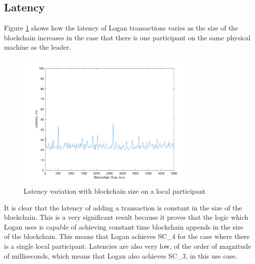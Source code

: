 \documentclass[12pt,a4paper,twoside,openright]{report}
\begin{document}
	\subsection{Latency}
	Figure \ref{fig:locallatency} shows how the latency of Logan transactions varies as the size of the blockchain increases in the case that there is one participant on the same physical machine as the leader. 
	\begin{figure}
		\centering
		\includegraphics[width=0.8\textwidth]{figs/local_latency_vs_size.png}
		\caption{Latency variation with blockchain size on a local participant}
		\label{fig:locallatency}
	\end{figure}
	It is clear that the latency of adding a transaction is constant in the size of the blockchain.
	This is a very significant result because it proves that the logic which Logan uses is capable of achieving constant time blockchain appends in the size of the blockchain.
	This means that Logan achieves SC\_4 for the case where there is a single local participant.
	Latencies are also very low, of the order of magnitude of milliseconds, which means that Logan also achieves SC\_3, in this use case.\\
\end{document}
